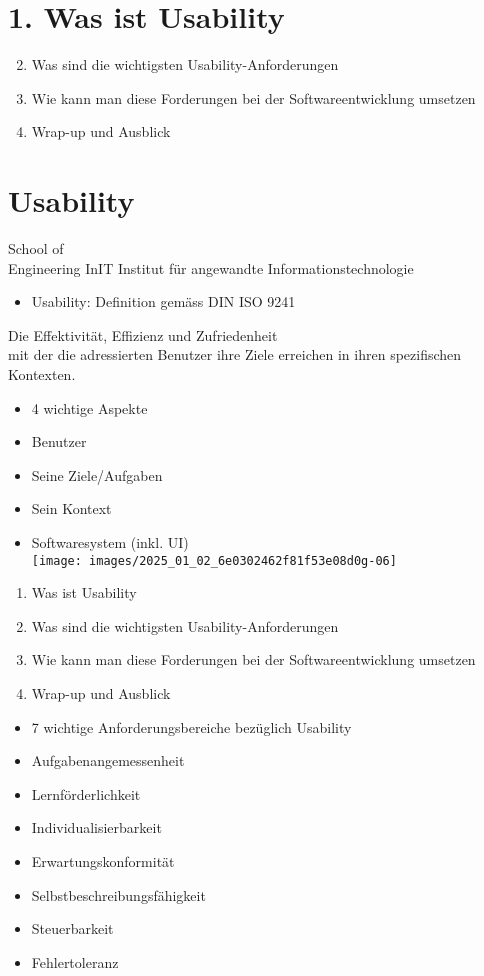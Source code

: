\documentclass[10pt]{article}
\begin{document}
\section*{1. Was ist Usability}
\begin{enumerate}
  \setcounter{enumi}{1}
  \item Was sind die wichtigsten Usability-Anforderungen
  \item Wie kann man diese Forderungen bei der Softwareentwicklung umsetzen
  \item Wrap-up und Ausblick
\end{enumerate}

\section*{Usability}
School of\\
Engineering InIT Institut für angewandte Informationstechnologie

\begin{itemize}
  \item Usability: Definition gemäss DIN ISO 9241
\end{itemize}

Die Effektivität, Effizienz und Zufriedenheit\\
mit der die adressierten Benutzer ihre Ziele erreichen in ihren spezifischen Kontexten.

\begin{itemize}
  \item 4 wichtige Aspekte
  \item Benutzer
  \item Seine Ziele/Aufgaben
  \item Sein Kontext
  \item Softwaresystem (inkl. UI)\\
\texttt{[image: images/2025\_01\_02\_6e0302462f81f53e08d0g-06]}
\end{itemize}

\begin{enumerate}
  \item Was ist Usability
  \item Was sind die wichtigsten Usability-Anforderungen
  \item Wie kann man diese Forderungen bei der Softwareentwicklung umsetzen
  \item Wrap-up und Ausblick
\end{enumerate}

\begin{itemize}
  \item 7 wichtige Anforderungsbereiche bezüglich Usability
  \item Aufgabenangemessenheit
  \item Lernförderlichkeit
  \item Individualisierbarkeit
  \item Erwartungskonformität
  \item Selbstbeschreibungsfähigkeit
  \item Steuerbarkeit
  \item Fehlertoleranz
\end{itemize}
\end{document}
